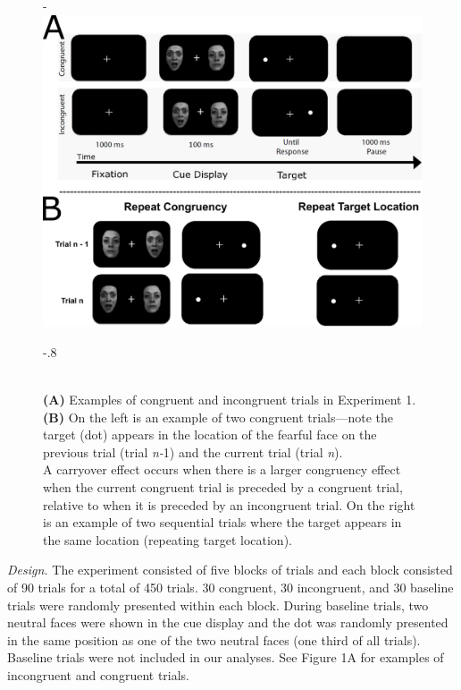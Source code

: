 \documentclass[issue,twocolumn,empirical, authordate,10pt]{jote-new-article}
\begin{document}
\begin{figure}[t!]
    \begin{adjustwidth}{-\fullwidthlen}{}
        \includegraphics[width=.95\linewidth]{./Figure1.png}
    \end{adjustwidth}
      \captionsetup{width=\dimexpr \linewidth + .8\fullwidthlen\relax}
 \begin{adjustwidth}{-.8\fullwidthlen}{}
  \caption{\\\textbf{(A)} Examples of congruent and incongruent trials in Experiment 1. \\\textbf{(B)} On the left is an example of two congruent trials—note the target (dot) appears in the location of the fearful face on the previous trial (trial \emph{n-}1) and the current trial (trial \emph{n}).\\ A carryover effect occurs when there is a larger congruency effect when the current congruent trial is preceded by a congruent trial, relative to when it is preceded by an incongruent trial. On the right is an example of two sequential trials where the target appears in the same location (repeating target location).}
  \end{adjustwidth}
\label{fig:fig1}
\end{figure}




\emph{Design. }The experiment consisted of five blocks of trials and each block consisted of 90 trials for a total of 450 trials. 30 congruent, 30 incongruent, and 30 baseline trials were randomly presented within each block. During baseline trials, two neutral faces were shown in the cue display and the dot was randomly presented in the same position as one of the two neutral faces (one third of all trials). Baseline trials were not included in our analyses. See Figure 1A for examples of incongruent and congruent trials.
\end{document}
